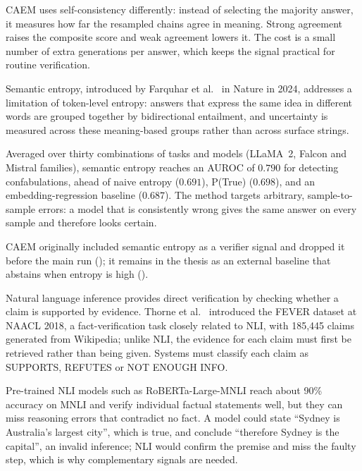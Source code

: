 CAEM uses self-consistency differently: instead of selecting the majority answer, it measures how far the resampled chains agree in meaning. Strong agreement raises the composite score and weak agreement lowers it. The cost is a small number of extra generations per answer, which keeps the signal practical for routine verification.

Semantic entropy, introduced by Farquhar et al.\ \cite{farquhar2024semantic} in Nature in 2024, addresses a limitation of token-level entropy: answers that express the same idea in different words are grouped together by bidirectional entailment, and uncertainty is measured across these meaning-based groups rather than across surface strings.

Averaged over thirty combinations of tasks and models (LLaMA~2, Falcon and Mistral families), semantic entropy reaches an AUROC of $0.790$ for detecting confabulations, ahead of naive entropy ($0.691$), P(True) ($0.698$), and an embedding-regression baseline ($0.687$). The method targets arbitrary, sample-to-sample errors: a model that is consistently wrong gives the same answer on every sample and therefore looks certain.

CAEM originally included semantic entropy as a verifier signal and dropped it before the main run (); it remains in the thesis as an external baseline that abstains when entropy is high ().

Natural language inference provides direct verification by checking whether a claim is supported by evidence. Thorne et al.\ \cite{thorne-etal-2018-fever} introduced the FEVER dataset at NAACL 2018, a fact-verification task closely related to NLI, with 185,445 claims generated from Wikipedia; unlike NLI, the evidence for each claim must first be retrieved rather than being given. Systems must classify each claim as SUPPORTS, REFUTES or NOT ENOUGH INFO.

Pre-trained NLI models such as RoBERTa-Large-MNLI reach about 90\% accuracy on MNLI and verify individual factual statements well, but they can miss reasoning errors that contradict no fact. A model could state ``Sydney is Australia's largest city'', which is true, and conclude ``therefore Sydney is the capital'', an invalid inference; NLI would confirm the premise and miss the faulty step, which is why complementary signals are needed.


